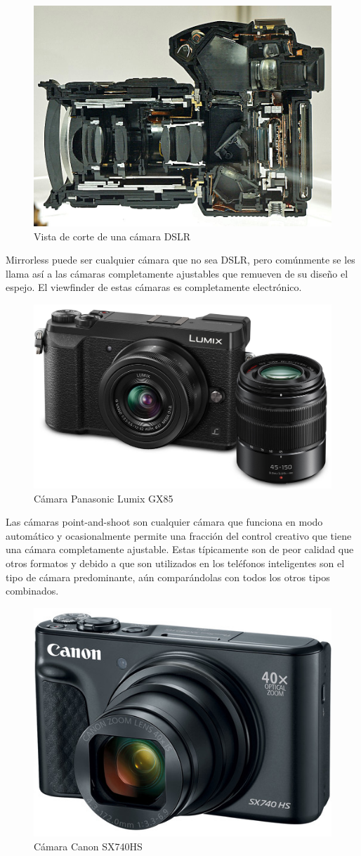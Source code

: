 \documentclass{article}
\begin{document}
\begin{figure}[H]
	\centering
	\includegraphics[width=0.65\linewidth]{Figuras/DSLR_2}
	\caption{Vista de corte de una cámara DSLR}
	\label{fig:dslr2}
\end{figure}

Mirrorless puede ser cualquier cámara que no sea DSLR, pero comúnmente se les llama así a las cámaras completamente ajustables que remueven de su diseño el espejo. El viewfinder de estas cámaras es completamente electrónico.

\begin{figure}[H]
	\centering
	\includegraphics[width=0.55\linewidth]{Figuras/Mirrorless}
	\caption{Cámara Panasonic Lumix GX85}
	\label{fig:mirrorless}
\end{figure}


Las cámaras point-and-shoot son cualquier cámara que funciona en modo automático y ocasionalmente permite una fracción del control creativo que tiene una cámara completamente ajustable. Estas típicamente son de peor calidad que otros formatos y debido a que son utilizados en los teléfonos inteligentes son el tipo de cámara predominante, aún comparándolas con todos los otros tipos combinados.

\begin{figure}[H]
	\centering
	\includegraphics[width=0.55\linewidth]{Figuras/point-and-shoot}
	\caption{Cámara Canon SX740HS}
	\label{fig:point-and-shoot}
\end{figure}
\end{document}

